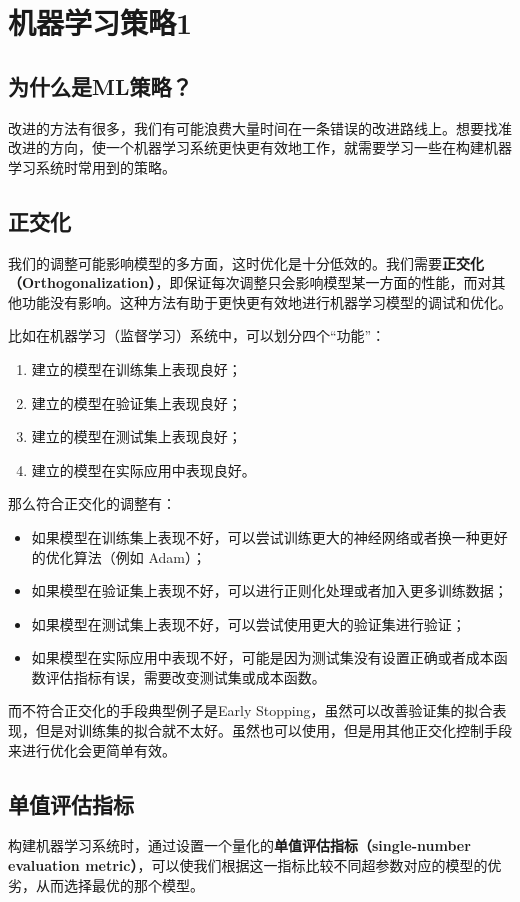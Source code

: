 \documentclass[../../main.tex]{subfiles}
\begin{document}
\chapter{机器学习策略1}

\section{为什么是ML策略？}
改进的方法有很多，我们有可能浪费大量时间在一条错误的改进路线上。想要找准改进的方向，使一个机器学习系统更快更有效地工作，就需要学习一些在构建机器学习系统时常用到的策略。

\section{正交化}
我们的调整可能影响模型的多方面，这时优化是十分低效的。我们需要\textbf{正交化（Orthogonalization）}，即保证每次调整只会影响模型某一方面的性能，而对其他功能没有影响。这种方法有助于更快更有效地进行机器学习模型的调试和优化。

比如在机器学习（监督学习）系统中，可以划分四个“功能”：
\begin{enumerate}
    \item 建立的模型在训练集上表现良好；
    \item 建立的模型在验证集上表现良好；
    \item 建立的模型在测试集上表现良好；
    \item 建立的模型在实际应用中表现良好。
\end{enumerate}
那么符合正交化的调整有：
\begin{itemize}
    \item 如果模型在训练集上表现不好，可以尝试训练更大的神经网络或者换一种更好的优化算法（例如 Adam）；
    \item 如果模型在验证集上表现不好，可以进行正则化处理或者加入更多训练数据；
    \item 如果模型在测试集上表现不好，可以尝试使用更大的验证集进行验证；
    \item 如果模型在实际应用中表现不好，可能是因为测试集没有设置正确或者成本函数评估指标有误，需要改变测试集或成本函数。
\end{itemize}
而不符合正交化的手段典型例子是Early Stopping，虽然可以改善验证集的拟合表现，但是对训练集的拟合就不太好。虽然也可以使用，但是用其他正交化控制手段来进行优化会更简单有效。

\section{单值评估指标}
构建机器学习系统时，通过设置一个量化的\textbf{单值评估指标（single-number evaluation metric）}，可以使我们根据这一指标比较不同超参数对应的模型的优劣，从而选择最优的那个模型。
\end{document}
